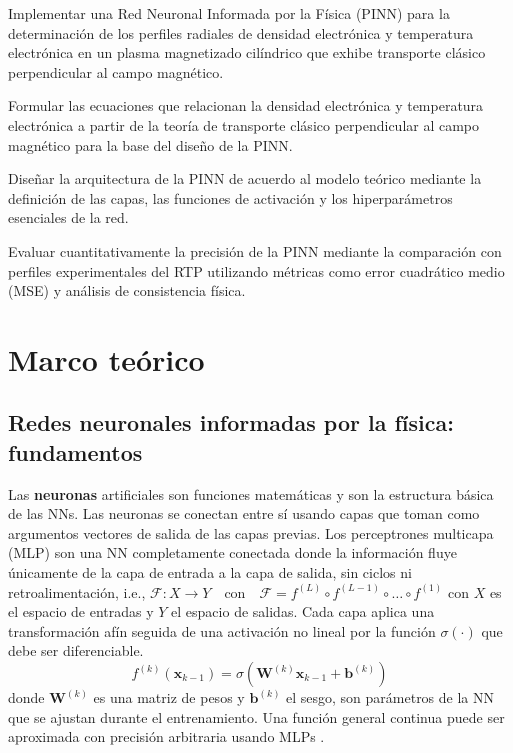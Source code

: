Implementar una Red Neuronal Informada por la Física (PINN) para la determinación de los perfiles radiales de densidad electrónica y temperatura electrónica en un plasma magnetizado cilíndrico que exhibe transporte clásico perpendicular al campo magnético.

Formular las ecuaciones que relacionan la densidad electrónica y temperatura electrónica a partir de la teoría de transporte clásico perpendicular al campo magnético para la base del diseño de la PINN.

Diseñar la arquitectura de la PINN de acuerdo al modelo teórico mediante la definición de las capas, las funciones de activación y los hiperparámetros esenciales de la red. 

Evaluar cuantitativamente la precisión de la PINN mediante la comparación con perfiles experimentales del RTP utilizando métricas como error cuadrático medio (MSE) y análisis de consistencia física.
\section{Marco teórico}

\subsection{Redes neuronales informadas por la física: fundamentos}

Las \textbf{neuronas} artificiales son funciones matemáticas y son la estructura básica de las NNs. Las neuronas se conectan entre sí usando capas que toman como argumentos vectores de salida de las capas previas. Los perceptrones multicapa (MLP) son una NN completamente conectada donde la información fluye únicamente de la capa de entrada a la capa de salida,  sin ciclos ni retroalimentación, i.e., $\mathcal{F} : X \rightarrow Y \quad \text{con} \quad \mathcal F = f^{(L)} \circ f^{(L-1)} \circ \dots \circ f^{(1)}$ con $X$ es el espacio de entradas y $Y$ el espacio de salidas. Cada capa aplica una transformación afín seguida de una activación no lineal por la función $\sigma(\cdot)$ que debe ser diferenciable.
\begin{equation}
	f^{(k)}(\bm{x}_{k-1})  = \sigma(\bm{W}^{(k)}\bm{x}_{k -1 } + \bm{b}^{(k)})
\end{equation}
 donde $\bm{W}^{(k)}$ es una matriz de pesos y  $\bm{b}^{(k)}$ el sesgo, son parámetros de la NN que se ajustan durante el entrenamiento. Una función general continua puede ser aproximada con precisión arbitraria usando MLPs \cite{cybenko1989, hornik1989}.
 
